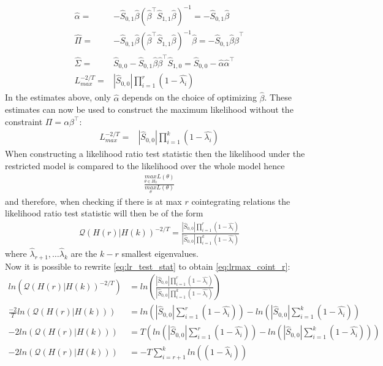 \begin{bevis}
\begin{align*}
    \hat{\alpha}=&-\hat{S}_{0,1}\hat{\beta}(\hat{\beta}^\top \hat{S}_{1,1}\hat{\beta})^{-1}=-\hat{S}_{0,1}\hat{\beta}\\
    \hat{\Pi}=&-\hat{S}_{0,1}\hat{\beta}(\hat{\beta}^\top \hat{S}_{1,1}\hat{\beta})^{-1}\hat{\beta}=-\hat{S}_{0,1}\hat{\beta}\hat{\beta}^\top\\
    \hat{\Sigma}=&\hat{S}_{0,0}-\hat{S}_{0,1}\hat{\beta}\hat{\beta}^\top\hat{S}_{1,0}=\hat{S}_{0,0}-\hat{\alpha}\hat{\alpha}^\top\\
    L_{max}^{-2/T}=&|\hat{S}_{0,0}|\prod_{i=1}^r(1-\hat{\lambda_i})
\end{align*}
In the estimates above, only $\hat{\alpha}$ depends on the choice of optimizing $\hat{\beta}$. These estimates can now be used to construct the maximum likelihood without the constraint $\Pi=\alpha\beta^{\top}$:
\begin{align*}
    L_{max}^{-2/T}=&|\hat{S}_{0,0}|\prod_{i=1}^k(1-\hat{\lambda_i})
\end{align*}
When constructing a likelihood ratio test statistic then the likelihood under the restricted model is compared to the likelihood over the whole model hence
\begin{align*}
    \frac{\underset{\theta\in H_0}{max}L(\theta)}{\underset{\theta}{max}L(\theta)}
\end{align*}
and therefore, when checking if there is at max $r$ cointegrating relations the likelihood ratio test statistic will then be of the form
\begin{align}\label{eq:lr_test_stat}
\mathcal{Q}(H(r)|H(k))^{-2/T}=\frac{|\hat{S}_{0,0}|\prod_{i=1}^r (1-\hat{\lambda_i})}{|\hat{S}_{0,0}|\prod_{i=1}^k(1-\hat{\lambda_i})}
\end{align}
where $\hat{\lambda}_{r+1},\ldots\hat{\lambda}_k$ are the $k-r$ smallest eigenvalues.\\
Now it is possible to rewrite \eqref{eq:lr_test_stat} to obtain \eqref{eq:lrmax_coint_r}:
\begin{align*}
ln\left(\mathcal{Q}(H(r)|H(k))^{-2/T}\right)&=ln\left(\frac{|\hat{S}_{0,0}|\prod_{i=1}^r (1-\hat{\lambda_i})}{|\hat{S}_{0,0}|\prod_{i=1}^k(1-\hat{\lambda_i})}\right)\\
    \frac{-2}{T}ln\left(\mathcal{Q}(H(r)|H(k))\right)&=ln\left(|\hat{S}_{0,0}| \sum_{i=1}^r (1-\hat{\lambda_i})\right)-ln\left(|\hat{S}_{0,0}|\sum_{i=1}^k (1-\hat{\lambda_i})\right)\\
    -2ln\left(\mathcal{Q}(H(r)|H(k))\right)&=T\left( ln\left(|\hat{S}_{0,0}| \sum_{i=1}^r (1-\hat{\lambda_i})\right)-ln\left(|\hat{S}_{0,0}|\sum_{i=1}^k (1-\hat{\lambda_i})\right)\right)\\
    -2ln\left(\mathcal{Q}(H(r)|H(k))\right)&=-T\sum_{i=r+1}^kln((1-\hat{\lambda}_i))
\end{align*}
\end{bevis} 




